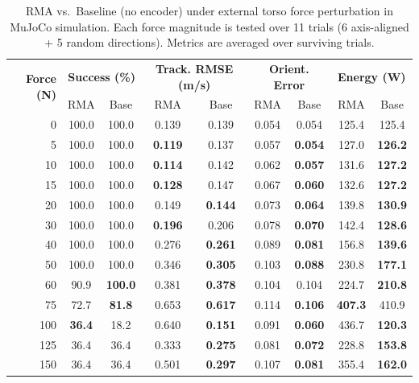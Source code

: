 \begin{table}[H]
\centering
\renewcommand{\arraystretch}{1.15}
\setlength{\tabcolsep}{4pt}
\caption{RMA vs.\ Baseline (no encoder) under external torso force perturbation in MuJoCo simulation. Each force magnitude is tested over 11 trials (6 axis-aligned + 5 random directions). Metrics are averaged over surviving trials.}
\label{tab:rma_eval}
\begin{tabularx}{\textwidth}{r|cc|cc|cc|cc}
\toprule
\multirow{2}{*}{\textbf{Force (N)}} & \multicolumn{2}{c|}{\textbf{Success (\%)}} & \multicolumn{2}{c|}{\textbf{Track. RMSE (m/s)}} & \multicolumn{2}{c|}{\textbf{Orient. Error}} & \multicolumn{2}{c}{\textbf{Energy (W)}} \\
& RMA & Base & RMA & Base & RMA & Base & RMA & Base \\
\midrule
0 & 100.0 & 100.0 & 0.139 & 0.139 & 0.054 & 0.054 & 125.4 & 125.4 \\
5 & 100.0 & 100.0 & \textbf{0.119} & 0.137 & 0.057 & \textbf{0.054} & 127.0 & \textbf{126.2} \\
10 & 100.0 & 100.0 & \textbf{0.114} & 0.142 & 0.062 & \textbf{0.057} & 131.6 & \textbf{127.2} \\
15 & 100.0 & 100.0 & \textbf{0.128} & 0.147 & 0.067 & \textbf{0.060} & 132.6 & \textbf{127.2} \\
20 & 100.0 & 100.0 & 0.149 & \textbf{0.144} & 0.073 & \textbf{0.064} & 139.8 & \textbf{130.9} \\
30 & 100.0 & 100.0 & \textbf{0.196} & 0.206 & 0.078 & \textbf{0.070} & 142.4 & \textbf{128.6} \\
40 & 100.0 & 100.0 & 0.276 & \textbf{0.261} & 0.089 & \textbf{0.081} & 156.8 & \textbf{139.6} \\
50 & 100.0 & 100.0 & 0.346 & \textbf{0.305} & 0.103 & \textbf{0.088} & 230.8 & \textbf{177.1} \\
60 & 90.9 & \textbf{100.0} & 0.381 & \textbf{0.378} & 0.104 & 0.104 & 224.7 & \textbf{210.8} \\
75 & 72.7 & \textbf{81.8} & 0.653 & \textbf{0.617} & 0.114 & \textbf{0.106} & \textbf{407.3} & 410.9 \\
100 & \textbf{36.4} & 18.2 & 0.640 & \textbf{0.151} & 0.091 & \textbf{0.060} & 436.7 & \textbf{120.3} \\
125 & 36.4 & 36.4 & 0.333 & \textbf{0.275} & 0.081 & \textbf{0.072} & 228.8 & \textbf{153.8} \\
150 & 36.4 & 36.4 & 0.501 & \textbf{0.297} & 0.107 & \textbf{0.081} & 355.4 & \textbf{162.0} \\
\bottomrule
\end{tabularx}
\end{table}